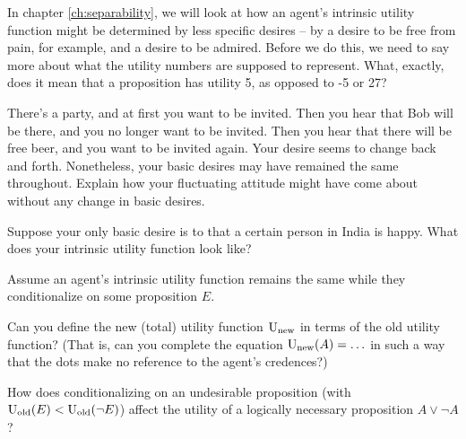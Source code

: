 In chapter \ref{ch:separability}, we will look at how an agent's intrinsic
utility function might be determined by less specific desires -- by a desire to
be free from pain, for example, and a desire to be admired. Before we do this,
we need to say more about what the utility numbers are supposed to represent.
What, exactly, does it mean that a proposition has utility 5, as opposed to -5
or 27?


\begin{exercise}{1}
  There's a party, and at first you want to be invited. Then you hear that Bob
  will be there, and you no longer want to be invited. Then you hear that
  there will be free beer, and you want to be invited again. Your desire seems
  to change back and forth. Nonetheless, your basic desires may have
  remained the same throughout. Explain how your fluctuating attitude
  might have come about without any change in basic desires.
\end{exercise}

\begin{exercise}{1}
  Suppose your only basic desire is to that a certain person in India is happy.
  What does your intrinsic utility function look like?
\end{exercise}

\begin{exercise}{3}
  Assume an agent's intrinsic utility function remains the same while they
  conditionalize on some proposition $E$.
  \begin{exlist}
    \item Can you define the new (total) utility function $\text{U}_{\text{new}}$ in
    terms of the old utility function? (That is, can you complete the equation
    $\text{U}_{\text{new}}(A) = \ldots$ in such a way that the dots make no reference
    to the agent's credences?)
    \item How does conditionalizing on an undesirable proposition (with
    $\text{U}_{\text{old}}(E) < \text{U}_{\text{old}}(\neg E)$) affect the utility of a
    logically necessary proposition $A \lor \neg A$?
  \end{exlist}
\end{exercise}

